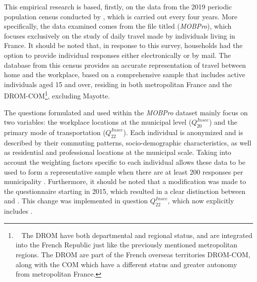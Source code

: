 \begin{refsegment}
This empirical research is based, firstly, on the data from the 2019 periodic population census conducted by \textcolor{blue}{\textcite{insee_documentation_2023}}, which is carried out every four years. More specifically, the data examined comes from the file titled  (\textsl{MOBPro}), which focuses exclusively on the study of daily travel made by individuals living in France. It should be noted that, in response to this survey, households had the option to provide individual responses either electronically or by mail. The database from this census provides an accurate representation of travel between home and the workplace, based on a comprehensive sample that includes active individuals aged 15 and over, residing in both metropolitan France and the \acrfull{DROM-COM}\footnote{~
    The \acrfull{DROM} have both departmental and regional status, and are integrated into the French Republic just like the previously mentioned metropolitan regions. The \acrshort{DROM} are part of the French overseas territories \acrshort{DROM-COM}, along with the \acrfull{COM} which have a different status and greater autonomy from metropolitan France.
}, excluding Mayotte. %

The questions formulated and used within the \textsl{MOBPro} dataset mainly focus on two variables: the workplace locations at the municipal level (\(Q^{Insee}_{20}\)) and the primary mode of transportation (\(Q^{Insee}_{22}\)). Each individual is anonymized and is described by their commuting patterns, socio-demographic characteristics, as well as residential and professional locations at the municipal scale. Taking into account the weighting factors specific to each individual allows these data to be used to form a representative sample when there are at least 200 responses per municipality \textcolor{blue}{\autocite{insee_documentation_2023}}. Furthermore, it should be noted that a modification was made to the questionnaire starting in 2015, which resulted in a clear distinction between  and  \textcolor{blue}{\autocite{razemon_pour_2013}}. This change was implemented in question \(Q^{Insee}_{22}\), which now explicitly includes . %


\end{refsegment}

